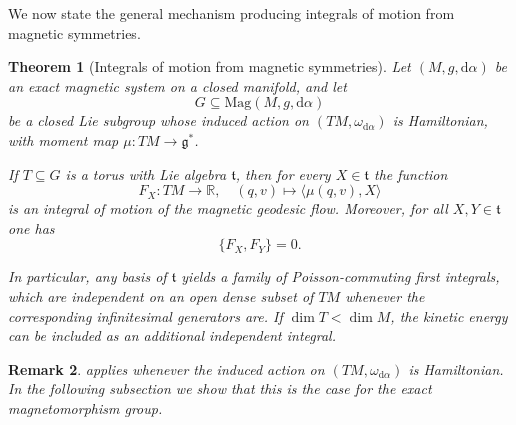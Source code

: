 \documentclass[11pt,reqno]{amsart}
\theoremstyle{plain}
\newtheorem{thm}{Theorem}[section]
\newtheorem{rem}[thm]{Remark}
\theoremstyle{definition}
\numberwithin{equation}{section}
\def\d{\delta}
\def\d{\delta}
\def\RR{{\mathbb R}}
\def\d{{\mathrm{d}}}
\begin{document}
We now state the general mechanism producing integrals of motion from magnetic symmetries.

\begin{thm}[Integrals of motion from magnetic symmetries]
\label{thm:lie_algebra_mag_group_encodes_integrals_of_motion}
Let $(M,g,\d\alpha)$ be an exact magnetic system on a closed manifold, and let
\[
G\subseteq \mathrm{Mag}(M,g,\d\alpha)
\]
be a closed Lie subgroup whose induced action on $(TM,\omega_{\d\alpha})$ is Hamiltonian, with moment map $\mu:TM\to\mathfrak g^*$.

If $T\subseteq G$ is a torus with Lie algebra $\mathfrak t$, then for every $X\in\mathfrak t$ the function
\[
F_X:TM\longrightarrow \RR, \quad (q,v)\mapsto\langle \mu(q,v),X\rangle
\]
is an integral of motion of the magnetic geodesic flow. Moreover, for all $X,Y\in\mathfrak t$ one has
\[
\{F_X,F_Y\}=0.
\]

In particular, any basis of $\mathfrak t$ yields a family of Poisson-commuting first integrals, which are independent on an open dense subset of $TM$ whenever the corresponding infinitesimal generators are. If $\dim T<\dim M$, the kinetic energy can be included as an additional independent integral.
\end{thm}

\begin{rem}
 applies whenever the induced action on $(TM,\omega_{\d\alpha})$ is Hamiltonian. In the following subsection we show that this is the case for the exact magnetomorphism group.
\end{rem}
\end{document}
